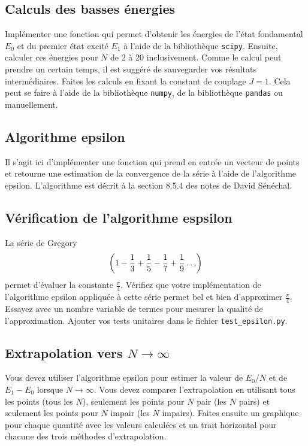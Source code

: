 \documentclass[12pt, letterpaper]{article}
\begin{document}
\subsection{Calculs des basses énergies}\label{subsec:calculs-des-basses-energies}

\noindent Implémenter une fonction qui permet d'obtenir les énergies de l'état fondamental
$E_0$ et du premier état excité $E_1$ à l'aide de la bibliothèque \texttt{scipy}.
Ensuite, calculer ces énergies pour $N$ de 2 à 20 inclusivement.
Comme le calcul peut prendre un certain temps, il est suggéré de
sauvegarder vos résultats intermédiaires.
Faites les calculs en fixant la constant de couplage $J = 1$.
Cela peut se faire à l'aide de la bibliothèque \texttt{numpy},
de la bibliothèque \texttt{pandas} ou manuellement.


\subsection{Algorithme epsilon}\label{subsec:algorithme-epsilon}

\noindent Il s'agit ici d'implémenter une fonction qui prend en entrée
un vecteur de points et
retourne une estimation de la convergence de la série à l'aide
de l'algorithme epsilon.
L'algorithme est décrit à la section 8.5.4 des notes de David Sénéchal.


\subsection{Vérification de l'algorithme espsilon}\label{subsec:verification-de-l'algorithme-espsilon}

\noindent La série de Gregory
\begin{equation}
  \qty(1 - \frac{1}{3} + \frac{1}{5} - \frac{1}{7} + \frac{1}{9} \ldots)
\end{equation}
permet d'évaluer la constante $\frac{\pi}{4}$.
Vérifiez que votre implémentation de l'algorithme epsilon appliquée à
cette série permet bel et bien d'approximer $\frac{\pi}{4}$.
Essayez avec un nombre variable de termes pour mesurer la qualité de l'approximation.
Ajouter vos tests unitaires dans le fichier \texttt{test\_epsilon.py}.


\subsection{Extrapolation vers $N \to \infty$}\label{subsec:extrapolation-vers-n-to-infty}

\noindent Vous devez utiliser l'algorithme epsilon
pour estimer la valeur de $E_0 / N$ et de $E_1 - E_0$ lorsque $N \to \infty$.
Vous devez comparer l'extrapolation en utilisant tous les points (tous les $N$),
seulement les points pour $N$ pair (les $N$ pairs) et seulement les points pour $N$ impair (les $N$ impairs).
Faites ensuite un graphique pour chaque quantité avec les valeurs calculées
et un trait horizontal pour chacune des trois méthodes d'extrapolation.
\end{document}
